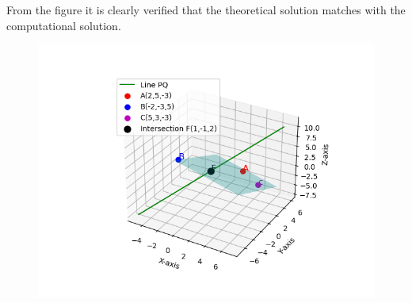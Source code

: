 \documentclass[journal]{IEEEtran}
\theoremstyle{remark}
\begin{document}
From the figure it is clearly verified that the theoretical solution matches with the computational solution.\\
\begin{figure}[h]
    \centering
    \includegraphics[height=0.5\textheight, keepaspectratio]{figs/figure1.png}
    \label{figure_1}
\end{figure}
\end{document}

